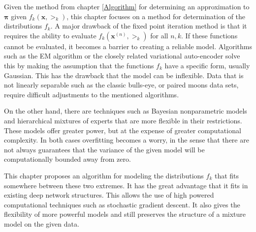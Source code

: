 Given the method from chapter \ref{Algorithm} for determining an approximation to \( \bm\pi \) given \( f_k(\bm x,\bm\gt_k) \), this chapter focuses on a method for determination of the distributions \( f_k \). A major drawback of the fixed point iteration method is that it requires the ability to evaluate $f_k(\bm x^{(n)},\bm\gt_k)$ for all $n,k$.  If these functions cannot be evaluated, it becomes a barrier to creating a reliable model.  Algorithms such as the EM algorithm or the closely related variational auto-encoder \cite{kingma2013auto,van2017neural} solve this by making the assumption that the functions $f_k$ have a specific form, usually Gaussian. This has the drawback that the model can be inflexible. Data that is not linearly separable such as the classic bulls-eye, or paired moons data sets, require difficult adjustments to the mentioned algorithms.

On the other hand, there are techniques such as Bayesian nonparametric models and
hierarchical mixtures of experts that are more flexible in their restrictions.  These
models offer greater power, but at the expense of greater computational complexity.  In
both cases overfitting becomes a worry, in the sense that there are not always guarantees that 
the variance of the given model will be computationally bounded away from zero.

This chapter proposes an algorithm for modeling the distributions $f_k$ that fits somewhere between these two
extremes. It has the great advantage that it fits in existing deep network structures. 
This allows the use of high powered computational techniques such as stochastic gradient
descent. It also gives the flexibility of more powerful models and still preserves
the structure of a mixture model on the given data.

